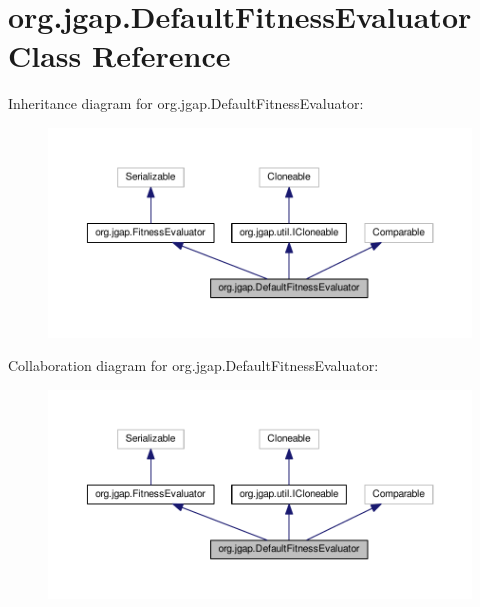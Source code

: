 \hypertarget{classorg_1_1jgap_1_1_default_fitness_evaluator}{\section{org.\-jgap.\-Default\-Fitness\-Evaluator Class Reference}
\label{classorg_1_1jgap_1_1_default_fitness_evaluator}
}


Inheritance diagram for org.\-jgap.\-Default\-Fitness\-Evaluator\-:
\nopagebreak
\begin{figure}[H]
\begin{center}
\leavevmode
\includegraphics[width=350pt]{classorg_1_1jgap_1_1_default_fitness_evaluator__inherit__graph}
\end{center}
\end{figure}


Collaboration diagram for org.\-jgap.\-Default\-Fitness\-Evaluator\-:
\nopagebreak
\begin{figure}[H]
\begin{center}
\leavevmode
\includegraphics[width=350pt]{classorg_1_1jgap_1_1_default_fitness_evaluator__coll__graph}
\end{center}
\end{figure}
